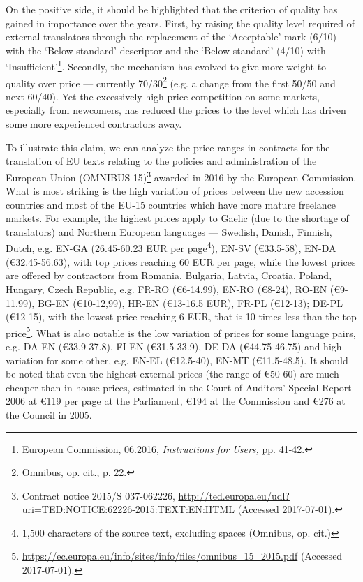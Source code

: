 \documentclass[output=paper]{langsci/langscibook}
\begin{document}
On the positive side, it should be highlighted that the criterion of quality has gained in importance over the years. First, by raising the quality level required of external translators through the replacement of the ‘Acceptable’ mark (6/10) with the ‘Below standard’ descriptor and the ‘Below standard’ (4/10) with ‘Insufficient’\footnote{European Commission, 06.2016, \textit{Instructions for Users,} pp. 41-42.}. Secondly, the mechanism has evolved to give more weight to quality over price — currently 70/30\footnote{Omnibus, op. cit., p. 22.} (e.g. a change from the first 50/50 and next 60/40). Yet the excessively high price competition on some markets, especially from newcomers, has reduced the prices to the level which has driven some more experienced contractors away. 

To illustrate this claim, we can analyze the price ranges in contracts for the translation of EU texts relating to the policies and administration of the European Union (OMNIBUS-15)\footnote{Contract notice 2015/S 037-062226, \url{http://ted.europa.eu/udl?uri=TED:NOTICE:62226-2015:TEXT:EN:HTML} (Accessed 2017-07-01).} awarded in 2016 by the European Commission. What is most striking is the high variation of prices between the new accession countries and most of the EU-15 countries which have more mature freelance markets. For example, the highest prices apply to Gaelic (due to the shortage of translators) and Northern European languages — Swedish, Danish, Finnish, Dutch, e.g. EN-GA (26.45-60.23 EUR per page\footnote{1,500 characters of the source text, excluding spaces (Omnibus, op. cit.)}), EN-SV ({\euro}33.5-58), EN-DA ({\euro}32.45-56.63), with top prices reaching 60 EUR per page, while the lowest prices are offered by contractors from Romania, Bulgaria, Latvia, Croatia, Poland, Hungary, Czech Republic, e.g. FR-RO ({\euro}6-14.99), EN-RO ({\euro}8-24), RO-EN ({\euro}9-11.99), BG-EN ({\euro}10-12,99), HR-EN ({\euro}13-16.5 EUR), FR-PL ({\euro}12-13); DE-PL ({\euro}12-15), with the lowest price reaching 6 EUR, that is 10 times less than the top price\footnote{\url{https://ec.europa.eu/info/sites/info/files/omnibus_15_2015.pdf} (Accessed 2017-07-01).}. What is also notable is the low variation of prices for some language pairs, e.g. DA-EN ({\euro}33.9-37.8), FI-EN ({\euro}31.5-33.9), DE-DA ({\euro}44.75-46.75) and high variation for some other, e.g. EN-EL ({\euro}12.5-40), EN-MT ({\euro}11.5-48.5). It should be noted that even the highest external prices (the range of {\euro}50-60) are much cheaper than in-house prices, estimated in the Court of Auditors’ Special Report 2006 at {\euro}119 per page at the Parliament, {\euro}194 at the Commission and {\euro}276 at the Council in 2005.
\end{document}
